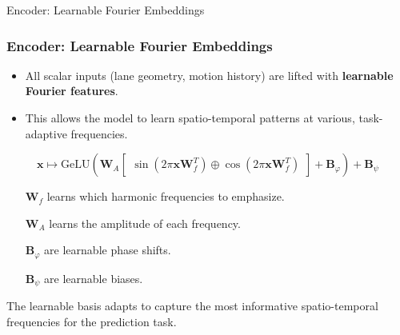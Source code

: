 \documentclass[10pt,aspectratio=169]{beamer}
\begin{document}
\begin{frame}{Encoder: Learnable Fourier Embeddings}
    \frametitle{Encoder: Learnable Fourier Embeddings}
    \begin{itemize}
        \item All scalar inputs (lane geometry, motion history) are lifted with \textbf{learnable Fourier features}.
        \item This allows the model to learn spatio-temporal patterns at various, task-adaptive frequencies.
    \end{itemize}
    \begin{equation}
      \label{eq:pres_learnable_fourier_embedding}
    \mathbf{x} \mapsto \text{GeLU}\left(\mathbf{W}_A \begin{bmatrix} \sin(2\pi \mathbf{x} \mathbf{W}_f^T) \oplus \cos(2\pi \mathbf{x} \mathbf{W}_f^T) \end{bmatrix} + \mathbf{B}_\varphi\right) + \mathbf{B}_\psi
    \end{equation}
    \begin{itemize}
        \item[\(\mathbf{W}_f\)] learns which harmonic frequencies to emphasize.
        \item[\(\mathbf{W}_A\)] learns the amplitude of each frequency.
        \item[\(\mathbf{B}_\varphi\)] are learnable phase shifts.
        \item[\(\mathbf{B}_\psi\)] are learnable biases.
    \end{itemize}
    \vspace{1em}
    \small{The learnable basis adapts to capture the most informative spatio-temporal frequencies for the prediction task.}
\end{frame}
\end{document}
